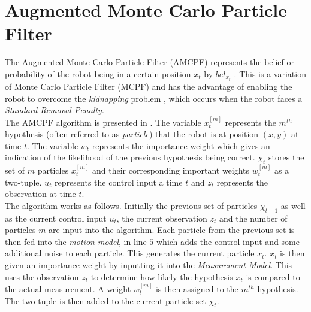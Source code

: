 \documentclass[11pt]{report}
\begin{document}
\section{Augmented Monte Carlo Particle Filter}
\label{sec:amcpf}
The Augmented Monte Carlo Particle Filter (AMCPF) represents the belief or probability of the robot being in a certain position $x_t$ by $bel_{x_t}$ \cite{Thrun2002}. This is a variation of Monte Carlo Particle Filter (MCPF) \cite{Thrun2002} and has the advantage of enabling the robot to overcome the \textit{kidnapping} problem \cite{Thrun2002}, which occurs when the robot faces a \textit{Standard Removal Penalty}. \\

The AMCPF algorithm is presented in  \cite{Thrun2002}. The variable $x_t^{[m]}$ represents the $m^{th}$ hypothesis (often referred to as \textit{particle}) that the robot is at position $(x,y)$ at time $t$. The variable $w_t$ represents the importance weight which gives an indication of the likelihood of the previous hypothesis being correct. $\bar{\chi}_t$ stores the set of $m$ particles $x_t^{[m]}$ and their corresponding important weights $w_t^{[m]}$ as a two-tuple. $u_t$ represents the control input a time $t$ and $z_t$ represents the observation at time $t$. \\

The algorithm works as follows. Initially the previous set of particles $\chi_{t-1}$ as well as the current control input $u_t$, the current observation $z_t$ and the number of particles $m$ are input into the algorithm. Each particle from the previous set is then fed into the \textit{motion model}, in line $5$ which adds the control input and some additional noise to each particle. This generates the current particle $x_t$. $x_t$ is then given an importance weight by inputting it into the \textit{Measurement Model}. This uses the observation $z_t$ to determine how likely the hypothesis $x_t$ is compared to the actual measurement. A weight $w_t^{[m]}$ is then assigned to the $m^{th}$ hypothesis. The two-tuple is then added to the current particle set $\bar{\chi}_t$.\\
\end{document}
